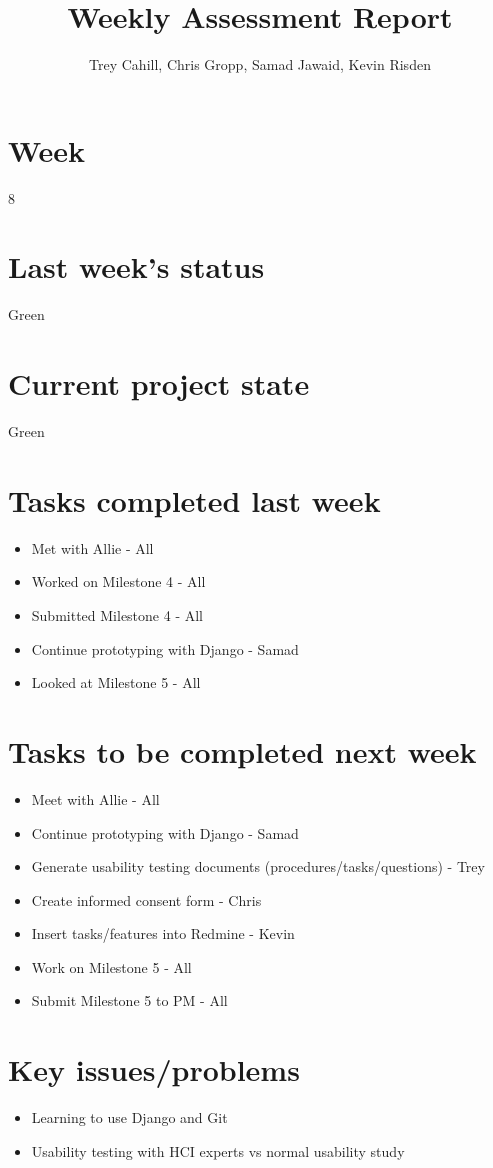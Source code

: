 \documentclass{article}
\title{Weekly Assessment Report}
\author{Trey Cahill, Chris Gropp, Samad Jawaid, Kevin Risden}
\begin{document}
\maketitle
\section{Week}
8
\section{Last week's status}
Green
\section{Current project state}
Green
\section{Tasks completed last week}
\begin{itemize}
\item Met with Allie - All
\item Worked on Milestone 4 - All
\item Submitted Milestone 4 - All
\item Continue prototyping with Django - Samad
\item Looked at Milestone 5 - All
\end{itemize}
\section{Tasks to be completed next week}
\begin{itemize}
\item Meet with Allie - All
\item Continue prototyping with Django - Samad
\item Generate usability testing documents (procedures/tasks/questions) - Trey
\item Create informed consent form - Chris
\item Insert tasks/features into Redmine - Kevin
\item Work on Milestone 5 - All
\item Submit Milestone 5 to PM - All
\end{itemize}
\section{Key issues/problems}
\begin{itemize}
\item Learning to use Django and Git
\item Usability testing with HCI experts vs normal usability study
\end{itemize}
\end{document}
